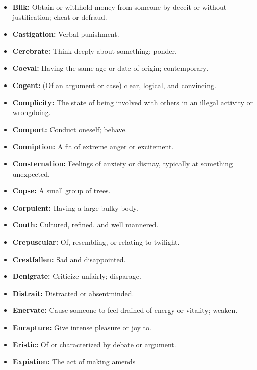 \documentclass[crop=false,class=book]{standalone}
\begin{document}
\begin{itemize}[noitemsep]
                \item \textbf{Bilk:} Obtain or withhold money from someone
                      by deceit or without justification; cheat or defraud.
                \item \textbf{Castigation:} Verbal punishment.
                \item \textbf{Cerebrate:} Think deeply about something; ponder.
                \item \textbf{Coeval:} Having the same age or date of
                      origin; contemporary.
                \item \textbf{Cogent:} (Of an argument or case) clear,
                      logical, and convincing.
                \item \textbf{Complicity:} The state of being involved
                      with others in an illegal activity or wrongdoing.
                \item \textbf{Comport:} Conduct oneself; behave.
                \item \textbf{Conniption:} A fit of extreme anger
                      or excitement.
                \item \textbf{Consternation:} Feelings of anxiety or
                      dismay, typically at something unexpected.
                \item \textbf{Copse:} A small group of trees.
                \item \textbf{Corpulent:} Having a large bulky body.
                \item \textbf{Couth:} Cultured, refined, and well mannered.
                \item \textbf{Crepuscular:} Of, resembling, or relating
                      to twilight.
                \item \textbf{Crestfallen:} Sad and disappointed.
                \item \textbf{Denigrate:} Criticize unfairly; disparage.
                \item \textbf{Distrait:} Distracted or absentminded.
                \item \textbf{Enervate:} Cause someone to feel drained of
                      energy or vitality; weaken.
                \item \textbf{Enrapture:} Give intense pleasure or joy to.
                \item \textbf{Eristic:} Of or characterized by debate
                      or argument.
                \item \textbf{Expiation:} The act of making amends

\end{itemize}
\end{document}
